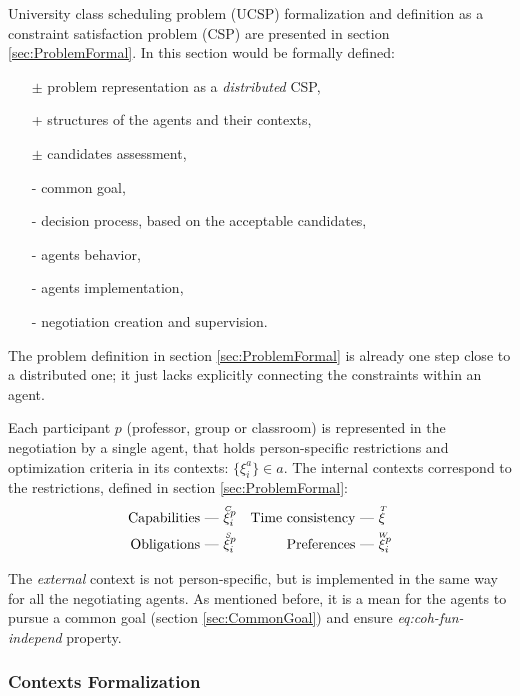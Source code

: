 University class scheduling problem (UCSP) formalization and definition as a
constraint satisfaction problem (CSP) are presented in section \ref{sec:ProblemFormal}.
In this section would be formally defined:
\begin{itemize}
  \item[$\pm$] problem representation as a \emph{distributed} CSP,
  \item[+] structures of the agents and their contexts,
  \item[$\pm$] candidates assessment,
  \item[-] common goal,
  \item[-] decision process, based on the acceptable candidates,
  \item[-] agents behavior,
  \item[-] agents implementation,
  \item[-] negotiation creation and supervision.
\end{itemize}


The problem definition in section \ref{sec:ProblemFormal} is already one step
close to a distributed one; it just lacks explicitly connecting the constraints
within an agent.

Each participant $p$ (professor, group or classroom) is represented in the negotiation
by a single agent, that holds person-specific restrictions and optimization criteria
in its contexts: $ \{\xi^a_i\} \in a$. The internal contexts correspond to
the restrictions, defined in section \ref{sec:ProblemFormal}:
\begin{align*}
   \text{Capabilities}      &\hbox{ --- } \accentset{C}{\xi}^p_i
&  \text{Time consistency}  &\hbox{ --- } \accentset{T}{\xi}
\\ \text{Obligations}       &\hbox{ --- } \accentset{S}{\xi}^p_i
&  \text{Preferences}       &\hbox{ --- } \accentset{W}{\xi}^p_i
\end{align*}

The \emph{external} context is not person-specific, but is implemented in the
same way for all the negotiating agents. As mentioned before, it is a mean for the
agents to pursue a common goal (section \ref{sec:CommonGoal}) and ensure
\emph{eq:coh-fun-independ} property.



\subsubsection{Contexts Formalization}

